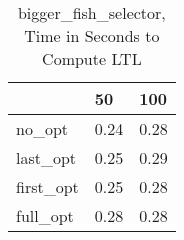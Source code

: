 \begin{table}
\caption{bigger\_fish\_selector, Time in Seconds to Compute LTL}
\label{bigger_fish_selector_LTL_time}
\begin{tabular}{lll}
\toprule
 & 50 & 100 \\
\midrule
no\_opt & 0.24 & 0.28 \\
last\_opt & 0.25 & 0.29 \\
first\_opt & 0.25 & 0.28 \\
full\_opt & 0.28 & 0.28 \\
\bottomrule
\end{tabular}
\end{table}
